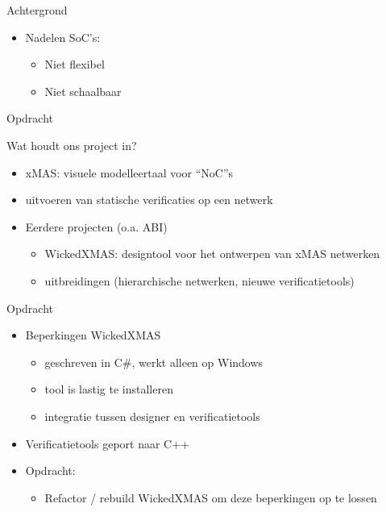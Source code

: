 \documentclass[10pt]{beamer}
\begin{document}
\begin{frame}[label=achtergrond2]{Achtergrond}
 \begin{itemize}
  \item Nadelen SoC's:
  \begin{itemize}
   \item Niet flexibel
   \item Niet schaalbaar
  \end{itemize}

 \end{itemize}

\end{frame}


\begin{frame}[label=opdracht]{Opdracht}
 
\par{Wat houdt ons project in?}

\begin{itemize}

    \item xMAS: visuele modelleertaal voor ``NoC''s
    \item uitvoeren van statische verificaties op een netwerk
    \item Eerdere projecten (o.a. ABI)
    \begin{itemize}
     \item WickedXMAS: designtool voor het ontwerpen van xMAS netwerken
     \item uitbreidingen (hierarchische netwerken, nieuwe verificatietools)
    \end{itemize}

\end{itemize}

 
\end{frame}

\begin{frame}{Opdracht}

\begin{itemize}
 \item Beperkingen WickedXMAS
 \begin{itemize}
  \item geschreven in C\#, werkt alleen op Windows
  \item tool is lastig te installeren
  \item integratie tussen designer en verificatietools
 \end{itemize}
 
 \item Verificatietools geport naar C++
 
 \item Opdracht:
 \begin{itemize}
  \item Refactor / rebuild WickedXMAS om deze beperkingen op te lossen
 \end{itemize}


\end{itemize}

\end{frame}
\end{document}
